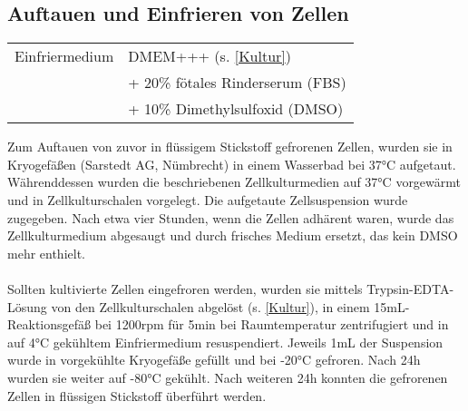 \subsection{Auftauen und Einfrieren von Zellen}
\begin{tabularx}{\textwidth}{ll}
	Einfriermedium 	& DMEM+++ (s. \ref{Kultur})		\\
					& + 20\% fötales Rinderserum (FBS) \\
					& + 10\% Dimethylsulfoxid (DMSO) \\
\end{tabularx}

Zum Auftauen von zuvor in flüssigem Stickstoff gefrorenen Zellen, wurden sie in Kryogefäßen (Sarstedt AG, Nümbrecht) in einem Wasserbad bei 37\si{\celsius} aufgetaut. Währenddessen wurden die beschriebenen Zellkulturmedien auf 37\si{\celsius} vorgewärmt und in Zellkulturschalen vorgelegt. Die aufgetaute Zellsuspension wurde zugegeben. Nach etwa vier Stunden, wenn die Zellen adhärent waren, wurde das Zellkulturmedium abgesaugt und durch frisches Medium ersetzt, das kein DMSO mehr enthielt.
\\
\\
Sollten kultivierte Zellen eingefroren werden, wurden sie mittels Trypsin-EDTA-Lösung von den Zellkulturschalen abgelöst (s. \ref{Kultur}), in einem 15\si{\milli\liter}-Reaktionsgefäß bei 1200\si{rpm} für 5\si{\minute} bei Raumtemperatur zentrifugiert und in auf 4\si{\celsius} gekühltem Einfriermedium resuspendiert. Jeweils 1\si{\milli\liter} der Suspension wurde in vorgekühlte Kryogefäße gefüllt und bei -20\si{\celsius} gefroren. Nach 24\si{\hour} wurden sie weiter auf -80\si{\celsius} gekühlt. Nach weiteren 24\si{\hour} konnten die gefrorenen Zellen in flüssigen Stickstoff überführt werden.

